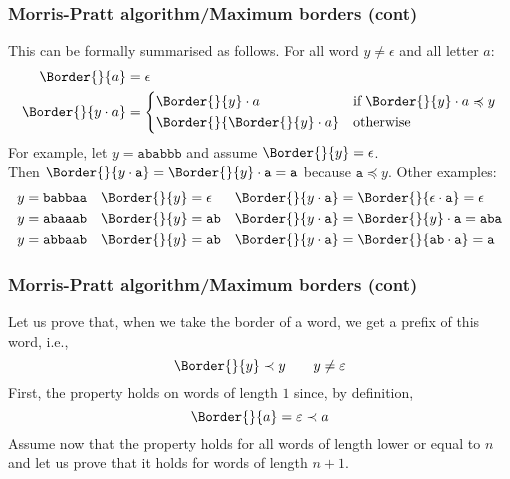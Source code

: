
%
\begin{frame}
\frametitle{Morris-Pratt algorithm/Maximum borders (cont)}

This can be formally summarised as follows. For all word \(y \neq
\epsilon\) and all letter \(a\):
\[
\begin{aligned}
  \Border{}{a}
 &= \epsilon\\
\Border{}{y \cdot a} &= \left\{
\begin{aligned}
& \Border{}{y} \cdot a 
&& \text{if} \; \Border{}{y} \cdot a \preccurlyeq y\\
& \Border{}{\Border{}{y} \cdot a} 
&& \text{otherwise}
\end{aligned}
\right.
\end{aligned}
\]
For example, let \(y = \texttt{ababbb}\) and assume \(\Border{}{y}  =
\epsilon\).\\ Then \(\Border{}{y \cdot \texttt{a}} = \Border{}{y} \cdot
\texttt{a} = \texttt{a}\) because \(\texttt{a} \preccurlyeq y\). Other
examples:
\begin{align*}
  y             &= \texttt{babbaa}
& \Border{}{y}  &= \epsilon
& \Border{}{y \cdot \texttt{a}} &= \Border{}{\epsilon \cdot
    \texttt{a}} = \epsilon\\
  y             &= \texttt{abaaab}
& \Border{}{y}  &= \texttt{ab}
& \Border{}{y \cdot \texttt{a}} &= \Border{}{y} \cdot \texttt{a} =
  \texttt{aba}\\
  y             &= \texttt{abbaab}
& \Border{}{y}  &= \texttt{ab}
& \Border{}{y \cdot \texttt{a}} &= \Border{}{\texttt{ab} \cdot
    \texttt{a}} = \texttt{a}
\end{align*}

\end{frame}

%
\begin{frame}
\frametitle{Morris-Pratt algorithm/Maximum borders (cont)}

\label{decreasing_borders_proof}

Let us prove that, when we take the border of a word, we get a prefix
of this word, i.e.,
\[
\Border{}{y} \prec y \qquad y \neq \varepsilon
\]
First, the property holds on words of length \(1\) since, by
definition,
\[
\Border{}{a} = \varepsilon \prec a
\]
Assume now that the property holds for all words of length lower or
equal to \(n\) and let us prove that it holds for words of length
\(n+1\).

\end{frame}

